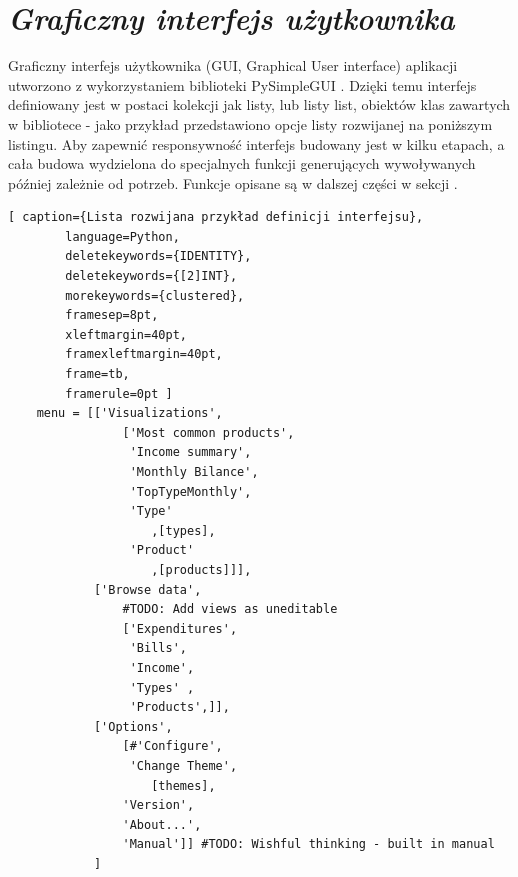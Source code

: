 \documentclass[a4paper,10pt, twoside]{report}
\newcommand{\customstylesection}[1]{\textbf{\textit{#1}}}
\begin{document}
\section{\customstylesection{Graficzny interfejs użytkownika}} 
\label{Graficzny interfejs użytkownika}
{Graficzny interfejs użytkownika (GUI, Graphical User interface) aplikacji 
utworzono z wykorzystaniem biblioteki PySimpleGUI \cite{PySimpleGUI}. Dzięki 
temu interfejs definiowany jest w postaci kolekcji jak listy, lub listy list, 
obiektów klas zawartych w bibliotece - jako przykład przedstawiono opcje listy 
rozwijanej na poniższym listingu. %
Aby zapewnić responsywność interfejs budowany jest w kilku etapach, a cała 
budowa wydzielona do specjalnych funkcji generujących wywoływanych później 
zależnie od potrzeb. Funkcje opisane są w dalszej części w sekcji 
.}

\begin{minipage}{\textwidth}
    \begin{lstlisting}[ caption={Lista rozwijana przykład definicji interfejsu},
        language=Python,
        deletekeywords={IDENTITY},
        deletekeywords={[2]INT},
        morekeywords={clustered},
        framesep=8pt,
        xleftmargin=40pt,
        framexleftmargin=40pt,
        frame=tb,
        framerule=0pt ]
    menu = [['Visualizations', 
                ['Most common products', 
                 'Income summary',
                 'Monthly Bilance',
                 'TopTypeMonthly',
                 'Type'
                    ,[types],
                 'Product'
                    ,[products]]],
            ['Browse data',
                #TODO: Add views as uneditable
                ['Expenditures',
                 'Bills',
                 'Income',
                 'Types' ,
                 'Products',]],
            ['Options',
                [#'Configure',
                 'Change Theme',
                    [themes],
                'Version',
                'About...',
                'Manual']] #TODO: Wishful thinking - built in manual
            ]
    \end{lstlisting}
\end{minipage}
\end{document}
